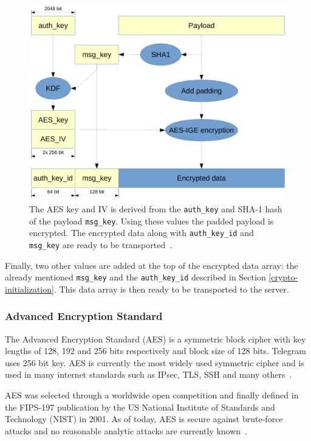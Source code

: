 \documentclass[thesis=M,english]{FITthesis}[2012/10/20]
\begin{document}
\begin{figure}[htb]
	\centering
	\includegraphics[width=1\textwidth]{mtproto-encflow.pdf}
	\caption[MTProto encryption flow]{The AES key and IV is derived from the \texttt{auth\_key} and SHA-1 hash of the payload \texttt{msg\_key}. Using these values the padded payload is encrypted. The encrypted data along with \texttt{auth\_key\_id} and \texttt{msg\_key} are ready to be transported~\cite{telegram-aarhus}.}
	\label{img:crypto-regular-enc}
\end{figure}

Finally, two other values are added at the top of the encrypted data array: the already mentioned \texttt{msg\_key} and the \texttt{auth\_key\_id} described in Section \ref{crypto-initialization}. This data array is then ready to be transported to the server.

\subsubsection{Advanced Encryption Standard}

The Advanced Encryption Standard (AES) is a symmetric block cipher with key lengths of 128, 192 and 256 bits respectively and block size of 128 bits. Telegram uses 256 bit key. AES is currently the most widely used symmetric cipher and is used in many internet standards such as IPsec, TLS, SSH and many others~\cite{understanding-crypto}.

AES was selected through a worldwide open competition and finally defined in the FIPS-197 publication by the US National Institute of Standards and Technology (NIST) in 2001. As of today, AES is secure against brute-force attacks and no reasonable analytic attacks are currently known~\cite{understanding-crypto}.
\end{document}
